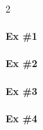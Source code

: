\documentclass[10pt,landscape]{article}
\begin{document}
\pagestyle{empty}



\newcommand{\mycontent}{
  \paragraph{Ex \#1} 
    \one
    \vspace*{\stretch{1}}

  \paragraph{Ex \#2} 
    \two
    \vspace*{\stretch{1}}
}


\setlength{\columnsep}{1in}
\begin{multicols*}{2}
  
  \paragraph{Ex \#1} 
    \one

  \paragraph{Ex \#2} 
    \two

  \columnbreak

  \paragraph{Ex \#3} 
    \three

  \paragraph{Ex \#4} 
    \four

\end{multicols*}
\end{document}
